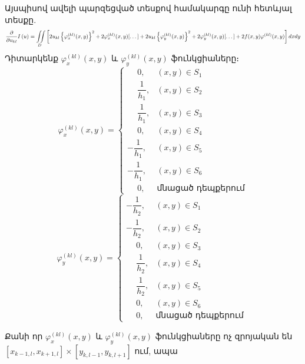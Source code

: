\documentclass[fleqn, bachelor,subf,12pt,notitlepage]{article}
\newcommand\scalemath[2]{\scalebox{#1}{\mbox{\ensuremath{\displaystyle #2}}}}
\begin{document}
Այսպիսով ավելի պարզեցված տեսքով համակարգը ունի հետևյալ տեսքը.
$$\scalemath{0.75}{\frac{\partial}{\partial u_{kl}}I \left(u\right)= \iint \limits_{D} \left[2u_{kl}\left\{\varphi_{x}^{(kl)}(x,y)\right\}^{2} + 2\varphi_{x}^{(kl)}(x,y)[\dots] + 2u_{kl}\left\{\varphi_{y}^{(kl)}(x,y)\right\}^{2} + 2\varphi_{y}^{(kl)}(x,y)[\dots] + 2f(x,y)\varphi^{(kl)}(x,y)\right]dxdy}$$
Դիտարկենք $\varphi_{x}^{(kl)}(x,y) $ և $\varphi_{y}^{(kl)}(x,y) $ ֆունկցիաները։
\begin{equation}
\varphi_{x}^{(kl)}(x,y)  = \begin{cases}
\phantom{-}0, &(x,y) \in S_{1} \\
\phantom{-}\dfrac{1}{h_{1}}, &(x,y) \in S_{2} \\
\phantom{-}\dfrac{1}{h_{1}}, &(x,y) \in S_{3} \\
\phantom{-}0, &(x,y) \in S_{4} \\
-\dfrac{1}{h_{1}}, &(x,y) \in S_{5} \\
-\dfrac{1}{h_{1}}, &(x,y) \in S_{6}\\
\phantom{-}0, &\text{մնացած դեպքերում}
\end{cases}
\end{equation}
\begin{equation}
\varphi_{y}^{(kl)}(x,y)  = \begin{cases}
-\dfrac{1}{h_{2}}, &(x,y) \in S_{1} \\
-\dfrac{1}{h_{2}}, &(x,y) \in S_{2} \\
\phantom{-}0, &(x,y) \in S_{3} \\
\phantom{-}\dfrac{1}{h_{2}}, &(x,y) \in S_{4} \\
\phantom{-}\dfrac{1}{h_{2}}, &(x,y) \in S_{5} \\
\phantom{-}0, &(x,y) \in S_{6}\\
\phantom{-}0, &\text{մնացած դեպքերում}
\end{cases} \;
\end{equation}

Քանի որ $\varphi_{x}^{(kl)}(x,y) $ և $\varphi_{y}^{(kl)}(x,y) $ ֆունկցիաները ոչ զրոյական են $\left[x_{k-1, l}, x_{k+1, l} \right] \times \left[y_{k, l-1}, y_{k, l+1}\right]$ ում, ապա
\end{document}
